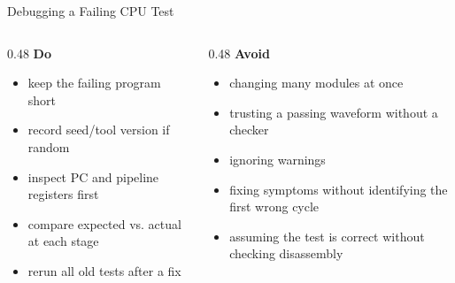 \documentclass[aspectratio=169,10pt]{beamer}
\begin{document}
\begin{frame}{Debugging a Failing CPU Test}
  \begin{center}
  \end{center}

  \vspace{0.9em}
  \begin{columns}[T]
    \begin{column}{0.48\textwidth}
      \textbf{Do}
      \begin{itemize}
        \item keep the failing program short
        \item record seed/tool version if random
        \item inspect PC and pipeline registers first
        \item compare expected vs. actual at each stage
        \item rerun all old tests after a fix
      \end{itemize}
    \end{column}
    \begin{column}{0.48\textwidth}
      \textbf{Avoid}
      \begin{itemize}
        \item changing many modules at once
        \item trusting a passing waveform without a checker
        \item ignoring warnings
        \item fixing symptoms without identifying the first wrong cycle
        \item assuming the test is correct without checking disassembly
      \end{itemize}
    \end{column}
  \end{columns}
\end{frame}
\end{document}
